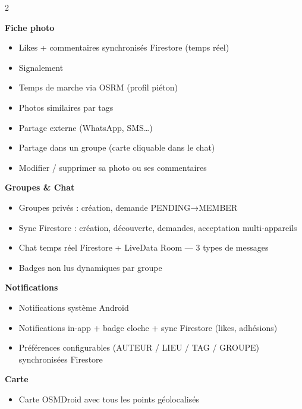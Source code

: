 \documentclass[a4paper,12pt,openany]{report}
\begin{document}
\begin{tcolorbox}
\begin{multicols}{2}
\columnbreak

\textbf{Fiche photo}
\begin{itemize}[leftmargin=*,itemsep=0pt,topsep=2pt]
  \item Likes + commentaires synchronisés Firestore (temps réel)
  \item Signalement
  \item Temps de marche via OSRM (profil piéton)
  \item Photos similaires par tags
  \item Partage externe (WhatsApp, SMS…)
  \item Partage dans un groupe (carte cliquable dans le chat)
  \item Modifier / supprimer sa photo ou ses commentaires
\end{itemize}

\textbf{Groupes \& Chat}
\begin{itemize}[leftmargin=*,itemsep=0pt,topsep=2pt]
  \item Groupes privés : création, demande PENDING→MEMBER
  \item Sync Firestore : création, découverte, demandes, acceptation multi-appareils
  \item Chat temps réel Firestore + LiveData Room — 3 types de messages
  \item Badges non lus dynamiques par groupe
\end{itemize}

\textbf{Notifications}
\begin{itemize}[leftmargin=*,itemsep=0pt,topsep=2pt]
  \item Notifications système Android
  \item Notifications in-app + badge cloche + sync Firestore (likes, adhésions)
  \item Préférences configurables (AUTEUR / LIEU / TAG / GROUPE) synchronisées Firestore
\end{itemize}

\textbf{Carte}
\begin{itemize}[leftmargin=*,itemsep=0pt,topsep=2pt]
  \item Carte OSMDroid avec tous les points géolocalisés
\end{itemize}
\end{multicols}
\end{tcolorbox}

\vspace{8pt}
\end{document}
